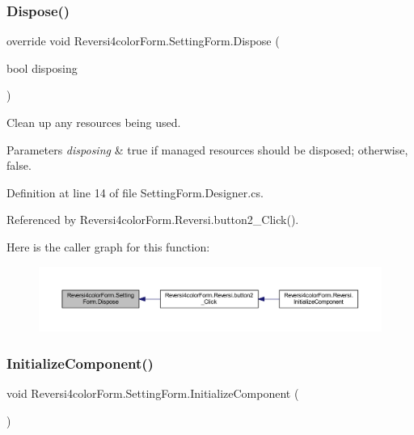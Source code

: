 \subsubsection{\texorpdfstring{Dispose()}{Dispose()}}
{\footnotesize\ttfamily override void Reversi4color\+Form.\+Setting\+Form.\+Dispose (\begin{DoxyParamCaption}\item[{bool}]{disposing }\end{DoxyParamCaption})\hspace{0.3cm}{\ttfamily [protected]}}



Clean up any resources being used. 


\begin{DoxyParams}{Parameters}
{\em disposing} & true if managed resources should be disposed; otherwise, false.\\
\hline
\end{DoxyParams}


Definition at line 14 of file Setting\+Form.\+Designer.\+cs.



Referenced by Reversi4color\+Form.\+Reversi.\+button2\+\_\+\+Click().

Here is the caller graph for this function\+:\nopagebreak
\begin{figure}[H]
\begin{center}
\leavevmode
\includegraphics[width=350pt]{class_reversi4color_form_1_1_setting_form_aea34274bc1a5cf018805d0bd6b429a77_icgraph}
\end{center}
\end{figure}
\mbox{\label{class_reversi4color_form_1_1_setting_form_a16ffb6338dd99bb75b8b52e8df9fe271}} 
\subsubsection{\texorpdfstring{Initialize\+Component()}{InitializeComponent()}}
{\footnotesize\ttfamily void Reversi4color\+Form.\+Setting\+Form.\+Initialize\+Component (\begin{DoxyParamCaption}{ }\end{DoxyParamCaption})\hspace{0.3cm}{\ttfamily [private]}}



